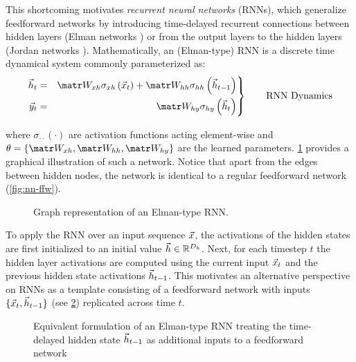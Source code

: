 This shortcoming motivates \emph{recurrent neural networks} (RNNs), which
generalize feedforward networks by introducing time-delayed recurrent
connections between hidden layers (Elman networks \citep{elman1990finding}) or
from the output layers to the hidden layers (Jordan networks
\citep{jordan1997serial}). Mathematically, an (Elman-type) RNN is a discrete time
dynamical system commonly parameterized as:
\begin{equation}\label{eq:rnn-dynamics}
 \left.\begin{aligned}
          \h_t &=& \W_{xh} \sigma_{xh} \left( \x_t \right) + \W_{hh} \sigma_{hh} \left( \h_{t-1} \right)\\
          \y_t &=& \W_{hy} \sigma_{hy} \left( \h_t \right)
       \end{aligned}
 \right\}
 \qquad \text{RNN Dynamics}
\end{equation}
\begin{align}
\end{align}
where $\sigma_{\cdot \cdot}(\cdot)$ are activation functions acting
element-wise and $\theta = \{ \W_{xh}, \W_{hh}, \W_{hy}\}$ are the learned
parameters. \cref{fig:nn-rnn} provides a graphical illustration of such a
network. Notice that apart from the edges between hidden nodes, the network is
identical to a regular feedforward network (\cref{fig:nn-ffw}).


\begin{figure}[htpb]
    \centering
    
    \caption{Graph representation of an Elman-type RNN.}
    \label{fig:nn-rnn}
\end{figure}

To apply the RNN over an input sequence $\vec{x}$, the activations of the hidden
states are first initialized to an initial value $\vec{h} \in \mathbb{R}^{D_{h}}$. Next,
for each timestep $t$ the hidden layer activations are computed using the
current input $\vec{x}_t$ and the previous hidden state activations $\vec{h}_{t-1}$.
This motivates an alternative perspective on RNNs as a template consisting
of a feedforward network with inputs $\{\vec{x}_t, \vec{h}_{t-1}\}$ (see
\cref{fig:rnn-elman}) replicated across time $t$.

\begin{figure}[htpb]
  \centering
  
  \caption{Equivalent formulation of an Elman-type RNN treating the
    time-delayed hidden state $\vec{h}_{t-1}$ as additional inputs to a feedforward
  network}
  \label{fig:rnn-elman}
\end{figure}



